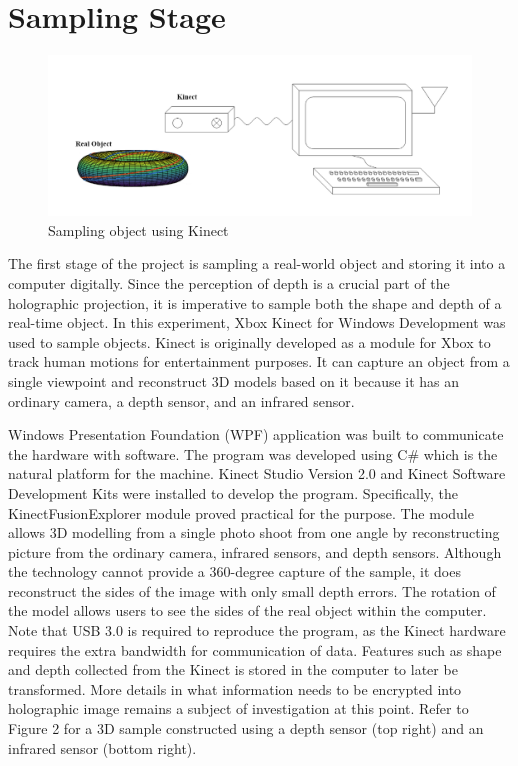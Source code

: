 \documentclass[12pt]{article}
\begin{document}
\newpage
\section{Sampling Stage}

\begin{figure}
    \centering
    \includegraphics[width=\textwidth]{sampling}
    \caption{Sampling object using Kinect}
    \label{fig:my_label}
\end{figure}
\qquad
The first stage of the project is sampling a real-world object and storing it into a computer digitally. Since the perception of depth is a crucial part of the holographic projection, it is imperative to sample both the shape and depth of a real-time object. In this experiment, Xbox Kinect for Windows Development was used to sample objects. Kinect is originally developed as a module for Xbox to track human motions for entertainment purposes. It can capture an object from a single viewpoint and reconstruct 3D models based on it because it has an ordinary camera, a depth sensor, and an infrared sensor. 

Windows Presentation Foundation (WPF) application was built to communicate the hardware with software. The program was developed using C\# which is the natural platform for the machine. Kinect Studio Version 2.0 and Kinect Software Development Kits were installed to develop the program. Specifically, the KinectFusionExplorer module proved practical for the purpose. The module allows 3D modelling from a single photo shoot from one angle by reconstructing picture from the ordinary camera, infrared sensors, and depth sensors. Although the technology cannot provide a 360-degree capture of the sample, it does reconstruct the sides of the image with only small depth errors. The rotation of the model allows users to see the sides of the real object within the computer. Note that USB 3.0 is required to reproduce the program, as the Kinect hardware requires the extra bandwidth for communication of data. Features such as shape and depth collected from the Kinect is stored in the computer to later be transformed. More details in what information needs to be encrypted into holographic image remains a subject of investigation at this point. Refer to Figure 2 for a 3D sample constructed using a depth sensor (top right) and an infrared sensor (bottom right).
\end{document}
